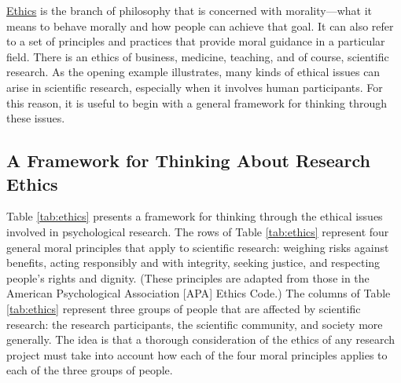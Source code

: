 \documentclass[
]{krantz}
\begin{document}
\protect\hyperlink{ethics}{Ethics} is the branch of philosophy that is concerned with morality---what it means to behave morally and how people can achieve that goal. It can also refer to a set of principles and practices that provide moral guidance in a particular field. There is an ethics of business, medicine, teaching, and of course, scientific research. As the opening example illustrates, many kinds of ethical issues can arise in scientific research, especially when it involves human participants. For this reason, it is useful to begin with a general framework for thinking through these issues.

\hypertarget{a-framework-for-thinking-about-research-ethics}{%
\subsection*{A Framework for Thinking About Research Ethics}\label{a-framework-for-thinking-about-research-ethics}}


Table \ref{tab:ethics} presents a framework for thinking through the ethical issues involved in psychological research. The rows of Table \ref{tab:ethics} represent four general moral principles that apply to scientific research: weighing risks against benefits, acting responsibly and with integrity, seeking justice, and respecting people's rights and dignity. (These principles are adapted from those in the American Psychological Association {[}APA{]} Ethics Code.) The columns of Table \ref{tab:ethics} represent three groups of people that are affected by scientific research: the research participants, the scientific community, and society more generally. The idea is that a thorough consideration of the ethics of any research project must take into account how each of the four moral principles applies to each of the three groups of people.
\end{document}
